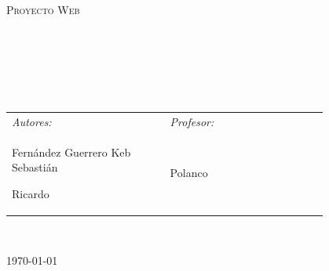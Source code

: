 \begin{center}
	\begin{minipage}{0.9\textwidth}
		\begin{center}
			\textsc{\LARGE Proyecto Web}
		\end{center}
	\end{minipage}\\[0.5cm]


	\vspace*{1cm}

	\HRule \\[0.4cm]
	{ \huge \bfseries \docTitulo}\\[0.4cm]

	\HRule \\[1.5cm]

	\begin{table}[H]
		\centering
		\begin{tabular}{L{0.4\linewidth} R{0.4\linewidth}}
			\emph{Autores:} & \emph{Profesor:} \\

			{%
			Fernández Guerrero Keb Sebastián

			Ricardo
			}               & {                %
					Polanco
			}                                  \\
		\end{tabular}
	\end{table}
	\vspace{1cm}

	\\
	\vspace{2cm}
	\begin{center}
		{\large \today}
	\end{center}
\end{center}

\newpage